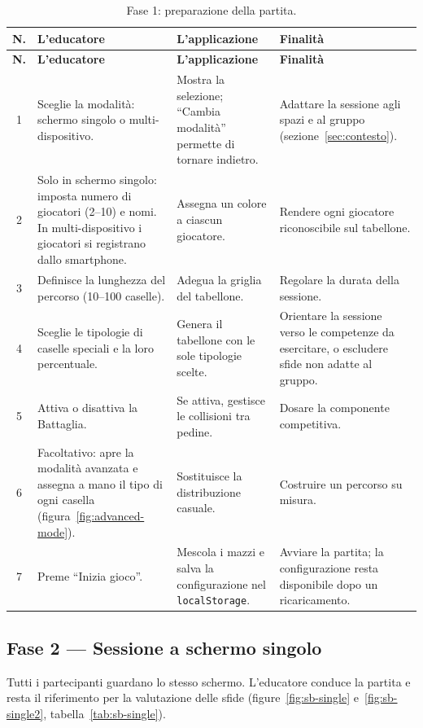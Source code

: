 \documentclass[12pt]{report}
\begin{document}
\begingroup\small
\begin{longtable}{@{}c p{3.9cm} p{3.9cm} p{3.4cm}@{}}
\caption{Fase 1: preparazione della partita.}\label{tab:sb-prep}\\
\hline
\textbf{N.} & \textbf{L'educatore} & \textbf{L'applicazione} & \textbf{Finalità} \\ \hline
\endfirsthead
\hline
\textbf{N.} & \textbf{L'educatore} & \textbf{L'applicazione} & \textbf{Finalità} \\ \hline
\endhead
1 & Sceglie la modalità: schermo singolo o multi-dispositivo. & Mostra la selezione; ``Cambia modalità'' permette di tornare indietro. & Adattare la sessione agli spazi e al gruppo (sezione~\ref{sec:contesto}). \\ \hline
2 & Solo in schermo singolo: imposta numero di giocatori (2--10) e nomi. In multi-dispositivo i giocatori si registrano dallo smartphone. & Assegna un colore a ciascun giocatore. & Rendere ogni giocatore riconoscibile sul tabellone. \\ \hline
3 & Definisce la lunghezza del percorso (10--100 caselle). & Adegua la griglia del tabellone. & Regolare la durata della sessione. \\ \hline
4 & Sceglie le tipologie di caselle speciali e la loro percentuale. & Genera il tabellone con le sole tipologie scelte. & Orientare la sessione verso le competenze da esercitare, o escludere sfide non adatte al gruppo. \\ \hline
5 & Attiva o disattiva la Battaglia. & Se attiva, gestisce le collisioni tra pedine. & Dosare la componente competitiva. \\ \hline
6 & Facoltativo: apre la modalità avanzata e assegna a mano il tipo di ogni casella (figura~\ref{fig:advanced-mode}). & Sostituisce la distribuzione casuale. & Costruire un percorso su misura. \\ \hline
7 & Preme ``Inizia gioco''. & Mescola i mazzi e salva la configurazione nel \texttt{localStorage}. & Avviare la partita; la configurazione resta disponibile dopo un ricaricamento. \\ \hline
\end{longtable}
\endgroup

\subsection{Fase 2 --- Sessione a schermo singolo}

Tutti i partecipanti guardano lo stesso schermo. L'educatore conduce la partita e resta il riferimento per la valutazione delle sfide (figure~\ref{fig:sb-single} e~\ref{fig:sb-single2}, tabella~\ref{tab:sb-single}).
\end{document}
